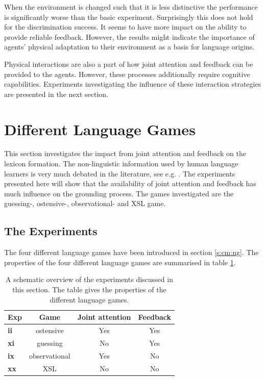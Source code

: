 When the environment is changed such that it is less distinctive the performance is significantly worse than the basic experiment. Surprisingly this does not hold for the discrimination success. It seems to have more impact on the ability to provide reliable feedback. However, the results might indicate the importance of agents' physical adaptation to their environment as a basis for language origins.


Physical interactions are also a part of how joint attention and feedback can be provided to the agents. However, these processes additionally require cognitive capabilities. Experiments investigating the influence of these interaction strategies are presented in the next section.


\section{Different Language Games}\label{s:par:feed}

This section investigates the impact from joint attention and feedback on the lexicon formation. The non-linguistic information used by human language learners is very much debated in the literature, see e.g. \citep{bowerman:1988,barrett:1995}. The experiments presented here will show that the availability of joint attention and feedback has much influence on the grounding process. The games investigated are the guessing-, ostensive-, observational- and XSL game.


\subsection{The Experiments}

The four different language games have been introduced in section \ref{s:cm:ng}. The properties of the four different language games are summarised in table \ref{t:par:lg}.

\begin{table}[h]
\centering
\begin{tabular}{||l|c|c|c||}
\hline\hline
Exp & Game & Joint attention & Feedback\\
\hline
{\bf ii} & ostensive & Yes & Yes\\
{\bf xi} & guessing & No & Yes\\
{\bf ix} & observational & Yes & No\\
{\bf xx} & XSL & No & No\\
\hline\hline
\end{tabular}
\caption{A schematic overview of the experiments discussed in this section. The table gives the properties of the different language games.}
\label{t:par:lg}
\end{table}



